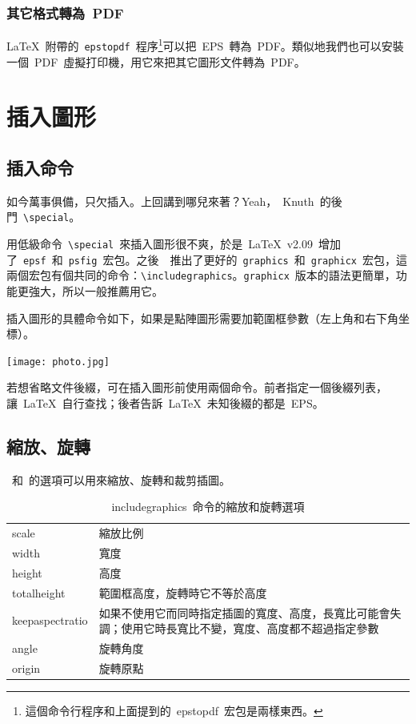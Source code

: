 \subsubsection{其它格式轉為~PDF}

\LaTeX~附帶的~\verb|epstopdf|~程序\footnote{這個命令行程序和上面提到的~epstopdf~宏包是兩樣東西。}可以把~EPS~轉為~PDF。類似地我們也可以安裝一個~PDF~虛擬打印機，用它來把其它圖形文件轉為~PDF。

\section{插入圖形}
\label{sec:includegraphics}

\subsection{插入命令}
如今萬事俱備，只欠插入。上回講到哪兒來著？Yeah，~Knuth~的後門~\verb|\special|。

用低級命令~\verb|\special|~來插入圖形很不爽，於是~\LaTeX~v2.09~增加了~\verb|epsf|~和~\verb|psfig|~宏包。之後~\LaTeXe~推出了更好的~\verb|graphics|~和~\verb|graphicx|~宏包，這兩個宏包有個共同的命令：\verb|\includegraphics|。\verb|graphicx|~版本的語法更簡單，功能更強大，所以一般推薦用它。

插入圖形的具體命令如下，如果是點陣圖形需要加範圍框參數（左上角和右下角坐標）。

\begin{code}
\texttt{[image: photo.jpg]}
\end{code}

若想省略文件後綴，可在插入圖形前使用兩個命令。前者指定一個後綴列表，讓~\LaTeX~自行查找；後者告訴~\LaTeX~未知後綴的都是~EPS。
\begin{code}
\end{code}

\subsection{縮放、旋轉}
~和~的選項可以用來縮放、旋轉和裁剪插圖。

\begin{table}[htbp]
\caption{includegraphics~命令的縮放和旋轉選項}
\label{tab:scale_angle}
\centering
\begin{tabularx}{350pt}{lX}
    \toprule
    scale & 縮放比例 \\
    width & 寬度 \\
    height & 高度 \\
    totalheight & 範圍框高度，旋轉時它不等於高度 \\
    keepaspectratio & 如果不使用它而同時指定插圖的寬度、高度，長寬比可能會失調；使用它時長寬比不變，寬度、高度都不超過指定參數 \\
    angle & 旋轉角度 \\
    origin & 旋轉原點 \\
    \bottomrule
\end{tabularx}
\end{table}

